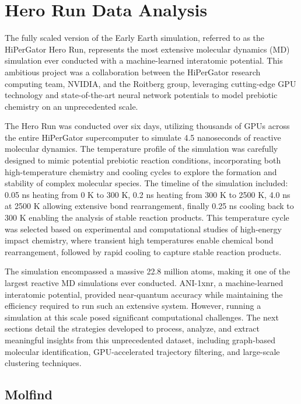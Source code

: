 \chapter{Hero Run Data Analysis} 
\label{chapter5}

The fully scaled version of the Early Earth simulation, referred to as the HiPerGator Hero Run, represents the most extensive molecular dynamics (MD) simulation ever conducted with a machine-learned interatomic potential. This ambitious project was a collaboration between the HiPerGator research computing team, NVIDIA, and the Roitberg group, leveraging cutting-edge GPU technology and state-of-the-art neural network potentials to model prebiotic chemistry on an unprecedented scale.

The Hero Run was conducted over six days, utilizing thousands of GPUs across the entire HiPerGator supercomputer to simulate 4.5 nanoseconds of reactive molecular dynamics. The temperature profile of the simulation was carefully designed to mimic potential prebiotic reaction conditions, incorporating both high-temperature chemistry and cooling cycles to explore the formation and stability of complex molecular species. The timeline of the simulation included: 0.05 ns heating from 0 K to 300 K, 0.2 ns heating from 300 K to 2500 K, 4.0 ns at 2500 K allowing extensive bond rearrangement, finally 0.25 ns cooling back to 300 K enabling the analysis of stable reaction products.
This temperature cycle was selected based on experimental and computational studies of high-energy impact chemistry, where transient high temperatures enable chemical bond rearrangement, followed by rapid cooling to capture stable reaction products.

The simulation encompassed a massive 22.8 million atoms, making it one of the largest reactive MD simulations ever conducted. ANI-1xnr, a machine-learned interatomic potential, provided near-quantum accuracy while maintaining the efficiency required to run such an extensive system. However, running a simulation at this scale posed significant computational challenges.
The next sections detail the strategies developed to process, analyze, and extract meaningful insights from this unprecedented dataset, including graph-based molecular identification, GPU-accelerated trajectory filtering, and large-scale clustering techniques.

\section{Molfind}
\label{sec:molfind}

